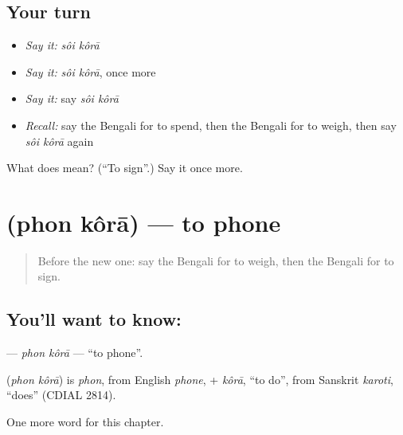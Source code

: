 \subsection*{Your turn}
\begin{itemize}
\raggedright
  \item \emph{Say it:} \emph{sôi kôrā}
  \item \emph{Say it:} \emph{sôi kôrā}, once more
  \item \emph{Say it:} say \emph{sôi kôrā}
  \item \emph{Recall:} say the Bengali for to spend, then the Bengali for to weigh, then say \emph{sôi kôrā} again
\end{itemize}

\begin{tcolorbox}[breakable,colback=teal!4,colframe=teal!35!black,title={Before you move on}]
What does   mean? (\textquotedblleft{}To sign\textquotedblright{}.) Say it once more.
\end{tcolorbox}
\section[\texorpdfstring{\bn{ফোন} \bn{করা} (phon kôrā)}{ফোন করা (phon kôrā)}]{  (phon kôrā) — to phone}

\label{lesson:BN-C210-phon-kora}



\begin{quote}
Before the new one: say the Bengali for to weigh, then the Bengali for to sign.
\end{quote}

\subsection*{You'll want to know:  }
\textbf{ } — \emph{phon kôrā} — \textquotedblleft{}to phone\textquotedblright{}.

\begin{cousinweb}
\textbf{ } (\emph{phon kôrā}) is \emph{phon}, from English \emph{phone}, + \emph{kôrā}, \textquotedblleft{}to do\textquotedblright{}, from Sanskrit \emph{karoti}, \textquotedblleft{}does\textquotedblright{} (CDIAL 2814).
\end{cousinweb}

\begin{grammarlens}[title={What you've built}]
One more word for this chapter.
\end{grammarlens}

